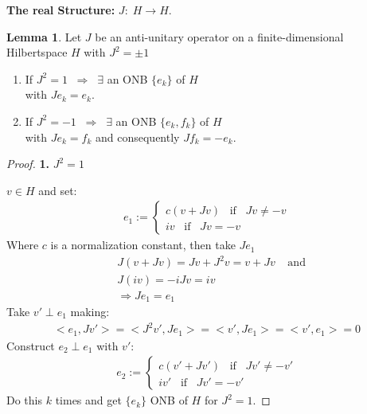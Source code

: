 \documentclass[a4paper]{article}
\theoremstyle{definition}
\theoremstyle{definition}
\theoremstyle{definition}
\theoremstyle{theorem}
\theoremstyle{theorem}
\newtheorem{lemma}{Lemma}
\theoremstyle{theorem}
\begin{document}
\textbf{The real Structure:} $J:\; H \rightarrow H$.
\begin{lemma}
    \label{lemma}
    Let $J$ be an anti-unitary operator on a finite-dimensional Hilbertspace
    $H$ with $J^2 = \pm 1 $
    \begin{enumerate}
        \item If $J^2 = 1 \;\; \Rightarrow \;\; \exists$ an ONB $\{e_k\}$ of $H$\\
            with $Je_k = e_k$.
        \item If $J^2 = -1 \;\; \Rightarrow \;\; \exists$ an ONB $\{e_k, f_k\}$ of $H$\\
            with $Je_k = f_k$ and consequently $Jf_k = -e_k$.
    \end{enumerate}
\end{lemma}
\begin{proof}
    \textbf{1.} $J^2 = 1$\newline

    $v\in H$ and set:
    \begin{align}
        e_1 :=
                \begin{cases}
                    c (v + Jv)\;\;\; \text{if}\;\;\; Jv \neq -v \\
                    iv\;\;\; \text{if}\;\;\; Jv = -v
                \end{cases}
    \end{align}
    Where $c$ is a normalization constant, then take $Je_1$
    \begin{align}
        &J(v + Jv) = Jv + J^2v= v + Jv \;\;\;\; \text{and} \\
        &J(iv) = -iJv = iv\\
        &\Rightarrow Je_1 = e_1
    \end{align}
    Take $v'\perp e_1$ making:
    \begin{align}
        <e_1 , Jv'> = <J^2 v', Je_1> = <v' , Je_1>= <v', e_1> =0
    \end{align}
    Construct $e_2 \perp e_1$ with $v'$:
    \begin{align}
        e_2 :=
        \begin{cases}
            c (v' + Jv')\;\;\; \text{if}\;\;\; Jv' \neq -v' \\
            iv'\;\;\; \text{if}\;\;\; Jv' = -v'
        \end{cases}
    \end{align}
    Do this $k$ times and get $\{e_k\}$ ONB of $H$ for $J^2 = 1$.
    \newline


\end{proof}
\end{document}
